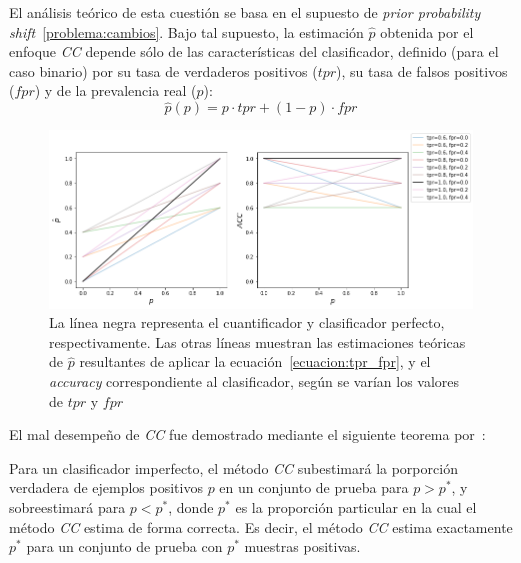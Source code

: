 El análisis teórico de esta cuestión se basa en el supuesto de {\it prior
probability shift\/}~\ref{problema:cambios}. Bajo tal supuesto, la estimación
$\hat p$ obtenida por el enfoque {\it CC\/} depende sólo de las características
del clasificador, definido (para el caso binario) por su tasa de verdaderos
positivos ($tpr$), su tasa de falsos positivos ($fpr$) y de la prevalencia real
($p$):
\begin{equation}\label{ecuacion:tpr_fpr}
    \hat p(p) = p \cdot {tpr} + (1-p) \cdot {fpr}
\end{equation}
\begin{figure}[h]
    \includegraphics[width=\textwidth]{../plots_teoria/cc_tpr_fpr.png}
    \caption{La línea negra representa el cuantificador y clasificador perfecto,
    respectivamente. Las otras líneas muestran las estimaciones teóricas de
    $\hat p$ resultantes de aplicar la ecuación~\ref{ecuacion:tpr_fpr}, y el
    {\it accuracy\/} correspondiente al clasificador, según se varían los
    valores de $tpr$ y $fpr$}\label{fig:cc_tpr_fpr}
\end{figure}

El mal desempeño de {\it CC\/} fue demostrado mediante el siguiente teorema
por~\citet{forman2008quantifying}:

\begin{theorem}
    \citep[p.169]{forman2008quantifying}\label{teorema:forman} Para un
    clasificador imperfecto, el método {\it CC\/} subestimará la porporción
    verdadera de ejemplos positivos $p$ en un conjunto de prueba para $p>p^*$, y
    sobreestimará para $p<p^*$, donde $p^*$ es la proporción particular en la
    cual el método {\it CC\/} estima de forma correcta. Es decir, el método {\it
    CC\/} estima exactamente $p^*$ para un conjunto de prueba con $p^*$ muestras
    positivas.
\end{theorem}

